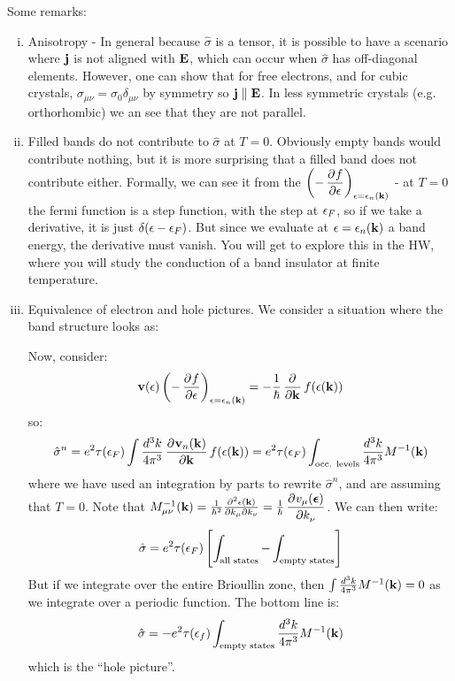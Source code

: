 Some remarks: 
\begin{enumerate}[(i)]
    \item Anisotropy - In general because $\hat{\sigma}$ is a tensor, it is possible to have a scenario where $\mathbf{j}$ is not aligned with $\mathbf{E}$, which can occur when $\hat{\sigma}$ has off-diagonal elements. However, one can show that for free electrons, and for cubic crystals, $\sigma_{\mu\nu} = \sigma_0 \delta_{\mu\nu}$ by symmetry so $\mathbf{j} \parallel \mathbf{E}$. In less symmetric crystals (e.g. orthorhombic) we an see that they are not parallel.
    \item Filled bands do not contribute to $\hat{\sigma}$ at $T = 0$. Obviously empty bands would contribute nothing, but it is more surprising that a filled band does not contribute either. Formally, we can see it from the $\left(-\dpd{f}{\e}\right)_{\e = \e_n(\v{k})}$ - at $T = 0$ the fermi function is a step function, with the step at $\epsilon_F$, so if we take a derivative, it is just $\delta(\epsilon - \epsilon_F)$. But since we evaluate at $\epsilon = \epsilon_n(\mathbf{k})$ a band energy, the derivative must vanish. You will get to explore this in the HW, where you will study the conduction of a band insulator at finite temperature.
    \item Equivalence of electron and hole pictures. We consider a situation where the band structure looks as:

    Now, consider:
    \begin{equation}
        \v{v}(\e)\left(-\dpd{f}{\e}\right)_{\e = \e_n(\v{k})} = -\frac{1}{\hbar}\dpd{}{\v{k}}f(\e(\v{k}))
    \end{equation}
    so:
    \begin{equation}
        \hat{\sigma}^n = e^2\tau(\e_F)\int \frac{d^3k}{4\pi^3} \dpd{\v{v}_n(\v{k})}{\v{k}}f(\e(\v{k})) = e^2\tau(\e_F)\int_{\text{occ. levels}} \frac{d^3k}{4\pi^3}M^{-1}(\v{k})
    \end{equation}
    where we have used an integration by parts to rewrite $\hat{\sigma}^n$, and are assuming that $T = 0$. Note that $M^{-1}_{\mu\nu}(\v{k}) = \frac{1}{\hbar^2}\frac{\partial^2 \e(\v{k})}{\partial k_\mu \partial k_\nu} = \frac{1}{\hbar}\dpd{v_\mu(\gv{\e})}{k_\nu}$. We can then write:
    \begin{equation}
        \hat{\sigma} = e^2 \tau(\epsilon_F)\left[\int_{\text{all states}} - \int_{\text{empty states}}\right]
    \end{equation}
    But if we integrate over the entire Brioullin zone, then $\int \frac{d^3k}{4\pi^3}M^{-1}(\mathbf{k}) = 0$ as we integrate over a periodic function. The bottom line is:
    \begin{equation}
        \hat{\sigma} = -e^2\tau(\epsilon_f)\int_{\text{empty states}}\frac{d^3k}{4\pi^3}M^{-1}(\mathbf{k})
    \end{equation}
    which is the ``hole picture''. 
\end{enumerate}

